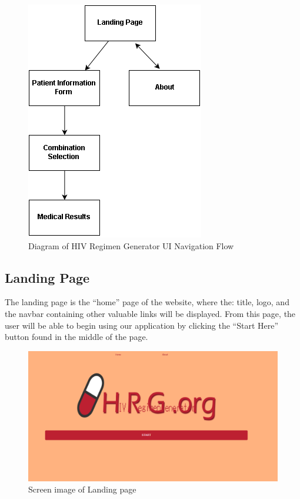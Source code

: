 \documentclass[12pt]{article}
\begin{document}
\begin{figure}[!h]
  \centering
  \includegraphics{navflow.png}
  \caption{Diagram of HIV Regimen Generator UI Navigation Flow}
  \label{fig:Diagram of HIV Regimen Generator UI Navigation Flow}
\end{figure}

\subsection{Landing Page}
The landing page is the “home” page of the website, where the: title, logo, and the navbar containing other valuable links will be displayed. From this page, the user will be able to begin using our application by clicking the “Start Here” button found in the middle of the page.

\begin{figure}[!h]
  \centering
  \includegraphics[width=\linewidth]{landing.png}
  \caption{Screen image of Landing page}
  \label{fig:landing}
\end{figure}
\end{document}
